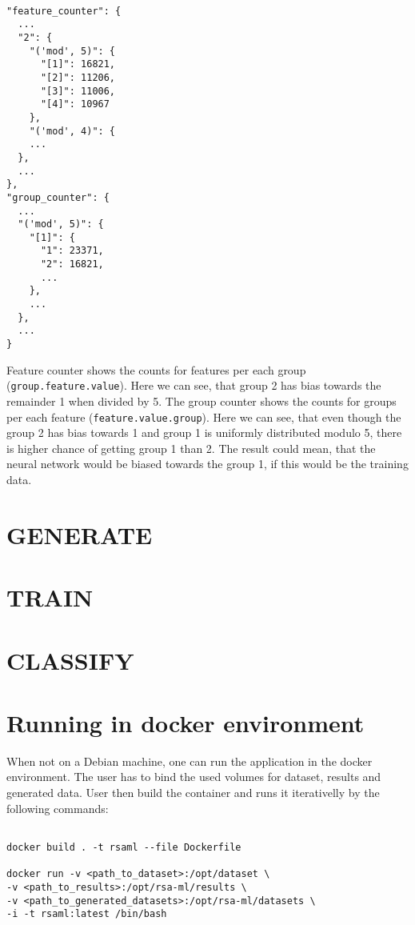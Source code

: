 \begin{verbatim}

"feature_counter": {
  ...
  "2": {
    "('mod', 5)": {
      "[1]": 16821,
      "[2]": 11206,
      "[3]": 11006,
      "[4]": 10967      
    },
    "('mod', 4)": {
    ...  
  },
  ...
},
"group_counter": {
  ...
  "('mod', 5)": {
    "[1]": {
      "1": 23371,
      "2": 16821,
      ...
    },
    ...
  },
  ...
}  

\end{verbatim}

\noindent
Feature counter shows the counts for features per each group (\texttt{group.feature.value}). Here we can see, that group 2 has bias towards the remainder 1 when divided by 5. The group counter shows the counts for groups per each feature (\texttt{feature.value.group}). Here we can see, that even though the group 2 has bias towards 1 and group 1 is uniformly distributed modulo 5, there is higher chance of getting group 1 than 2. The result could mean, that the neural network would be biased towards the group 1, if this would be the training data.


\section*{GENERATE}
\section*{TRAIN}
\section*{CLASSIFY}
\section*{Running in docker environment}

When not on a Debian machine, one can run the application in the docker environment. The user has to bind the used volumes for dataset, results and generated data. User then build the container and runs it iterativelly by the following commands:

\begin{verbatim}

docker build . -t rsaml --file Dockerfile

docker run -v <path_to_dataset>:/opt/dataset \
-v <path_to_results>:/opt/rsa-ml/results \
-v <path_to_generated_datasets>:/opt/rsa-ml/datasets \
-i -t rsaml:latest /bin/bash

\end{verbatim}

